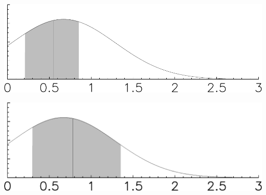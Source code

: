 \documentclass[12pt]{article}
\begin{document}








\mbox{ }
\vfill

\includegraphics[width=\linewidth]{plenary_probabilityplot}

\vfill

\includegraphics[width=\linewidth]{plenary_probabilityplot_corrected}

\vfill
\mbox{ }
\end{document}
